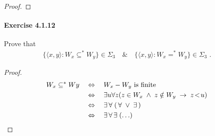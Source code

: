 \documentclass[a4paper,11pt]{article}
\begin{document}
\begin{proof}

\end{proof}


\paragraph{Exercise 4.1.12}

Prove that
\begin{align*}
  \{ \langle x, y \rangle : W_x \subseteq^* W_y \} \in \Sigma_3 \quad \& \quad \{ \langle x, y \rangle : W_x =^* W_y \} \in \Sigma_3 \text{ .}
\end{align*}
\begin{proof}
\begin{align*}
  W_x \subseteq^* Wy \quad & \Leftrightarrow \quad \text{$W_x - W_y$ is finite}\\
  & \Leftrightarrow \quad \exists u \forall z(z \in W_x \; \wedge \; z \notin W_y \; \rightarrow \; z \! < \! u)\\
  & \Leftrightarrow \quad \exists \, \forall \; ( \, \forall \; \vee \; \exists \, )\\
  & \Leftrightarrow \quad \exists \, \forall \, \exists \; (\ldots) \qedhere
\end{align*}
\end{proof}
\end{document}
